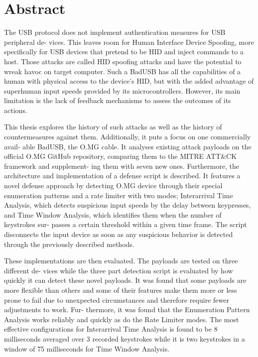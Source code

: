 \chapter*{Abstract}


The USB protocol does not implement authentication measures for USB peripheral de-
vices. This leaves room for Human Interface Device Spoofing, more specifically for USB
devices that pretend to be HID and inject commands to a host. Those attacks are called
HID spoofing attacks and have the potential to wreak havoc on target computer. Such a
BadUSB has all the capabilities of a human with physical access to the device’s HID, but
with the added advantage of superhuman input speeds provided by its microcontrollers.
However, its main limitation is the lack of feedback mechanisms to assess the outcomes
of its actions. 

This thesis explores the history of such attacks as well as the history of
countermeasures against them. Additionally, it puts a focus on one commercially avail-
able BadUSB, the O.MG cable.
 It analyses existing attack payloads on the official O.MG
GitHub repository, comparing them to the MITRE ATT&CK framework and supplement-
ing them with seven new ones. Furthermore, the architecture and implementation of a
defense script is described. It features a novel defense approach by detecting O.MG device
through their special enumeration patterns and a rate limiter with two modes; Interarrival
Time Analysis, which detects suspicious input speeds by the delay between keypresses,
and Time Window Analysis, which identifies them when the number of keystrokes sur-
passes a certain threshold within a given time frame. The script disconnects the input
device as soon as any suspicious behavior is detected through the previously described
methods.

These implementations are then evaluated. The payloads are tested on three different de-
vices while the three part detection script is evaluated by how quickly it can detect these
novel payloads. It was  found that some payloads are more flexible than others and some of
their features make them more or less prone to fail due to unexpected circumstances and therefore require fewer adjustments to work. Fur-
thermore, it was found that the Enumeration Pattern Analysis works reliably and quickly
as do the Rate Limiter modes. The most effective configurations for Interarrival Time
Analysis is found to be 8 milliseconds averaged over 3 recorded keystrokes while it is two
keystrokes in a window of 75 milliseconds for Time Window Analysis.

